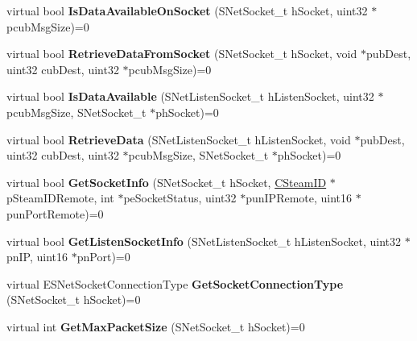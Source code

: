 \begin{DoxyCompactItemize}
\item 
\mbox{\label{class_i_steam_networking_a3c8584b744d21f9090fa1266da4ee820}} 
virtual bool {\bfseries Is\+Data\+Available\+On\+Socket} (S\+Net\+Socket\+\_\+t h\+Socket, uint32 $\ast$pcub\+Msg\+Size)=0
\item 
\mbox{\label{class_i_steam_networking_ae1f443372f7f153951e9d0e39c1a643b}} 
virtual bool {\bfseries Retrieve\+Data\+From\+Socket} (S\+Net\+Socket\+\_\+t h\+Socket, void $\ast$pub\+Dest, uint32 cub\+Dest, uint32 $\ast$pcub\+Msg\+Size)=0
\item 
\mbox{\label{class_i_steam_networking_a061e82b63b61aa51169c00c5d2fe21f3}} 
virtual bool {\bfseries Is\+Data\+Available} (S\+Net\+Listen\+Socket\+\_\+t h\+Listen\+Socket, uint32 $\ast$pcub\+Msg\+Size, S\+Net\+Socket\+\_\+t $\ast$ph\+Socket)=0
\item 
\mbox{\label{class_i_steam_networking_aad639c6d6b67bf041650788787108752}} 
virtual bool {\bfseries Retrieve\+Data} (S\+Net\+Listen\+Socket\+\_\+t h\+Listen\+Socket, void $\ast$pub\+Dest, uint32 cub\+Dest, uint32 $\ast$pcub\+Msg\+Size, S\+Net\+Socket\+\_\+t $\ast$ph\+Socket)=0
\item 
\mbox{\label{class_i_steam_networking_af970cbc561c07dfb36262ebdfd2e40df}} 
virtual bool {\bfseries Get\+Socket\+Info} (S\+Net\+Socket\+\_\+t h\+Socket, \hyperlink{class_c_steam_i_d}{C\+Steam\+ID} $\ast$p\+Steam\+I\+D\+Remote, int $\ast$pe\+Socket\+Status, uint32 $\ast$pun\+I\+P\+Remote, uint16 $\ast$pun\+Port\+Remote)=0
\item 
\mbox{\label{class_i_steam_networking_a79f181bd4900cdfd53dbad9ef6c666c3}} 
virtual bool {\bfseries Get\+Listen\+Socket\+Info} (S\+Net\+Listen\+Socket\+\_\+t h\+Listen\+Socket, uint32 $\ast$pn\+IP, uint16 $\ast$pn\+Port)=0
\item 
\mbox{\label{class_i_steam_networking_ab71b58659a1c62bd021c22679ed37c9a}} 
virtual E\+S\+Net\+Socket\+Connection\+Type {\bfseries Get\+Socket\+Connection\+Type} (S\+Net\+Socket\+\_\+t h\+Socket)=0
\item 
\mbox{\label{class_i_steam_networking_a9536c5df8fe1b06194b12e1e7a589e95}} 
virtual int {\bfseries Get\+Max\+Packet\+Size} (S\+Net\+Socket\+\_\+t h\+Socket)=0
\end{DoxyCompactItemize}


